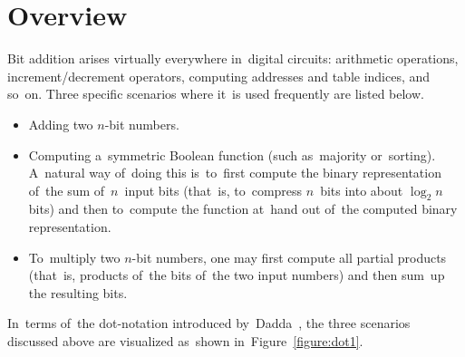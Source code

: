 \documentclass[sigconf, review, anonymous]{acmart}
\begin{document}
\maketitle

\section{Overview}
Bit addition arises virtually everywhere in~digital circuits:
arithmetic operations,
increment/decrement operators,
computing addresses and table indices, and so~on.
Three specific scenarios where it~is used frequently are listed below.
\begin{itemize}
	\item Adding two $n$-bit numbers.
	\item Computing a~symmetric Boolean function
		(such as~majority or~sorting).
		A~natural way of~doing this is~to~first compute
		the binary representation of~the sum of~$n$~input bits
		(that~is, to~compress $n$~bits into about $\log_2 n$ bits)
		and then to~compute the function at~hand
		out of~the computed binary representation.
	\item To~multiply two $n$-bit numbers, one may first compute
		all partial products (that~is, products of~the bits of~the 
		two input numbers) and then sum~up the resulting bits.
\end{itemize}
In~terms of~the dot-notation introduced by~Dadda~\cite{dadda}, the three scenarios discussed above are visualized as~shown in~Figure~\ref{figure:dot1}.
\end{document}
